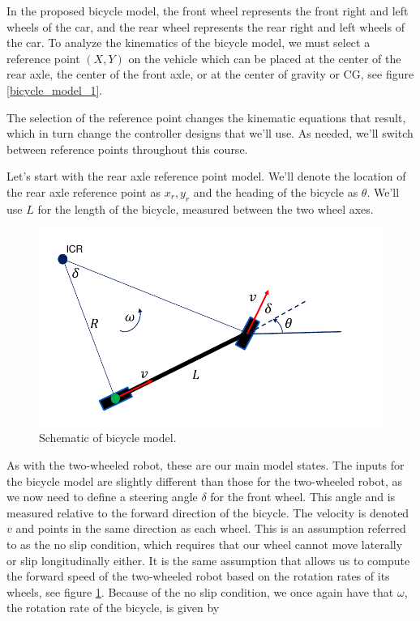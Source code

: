 In the proposed bicycle model, the front wheel represents the front right and left wheels of the car, and the rear wheel represents the rear right and left wheels of the car. 
To analyze the kinematics of the bicycle model, we must select a reference point $(X, Y)$ on the vehicle which can be placed at the center of the rear axle, the center of the front axle, or at the center of gravity or CG, see figure \ref{bicycle_model_1}. 

The selection of the reference point changes the kinematic equations that result, which in turn change the controller designs that we'll use. As needed, we'll switch between reference points throughout this course. 


Let's start with the rear axle reference point model. We'll denote the location of the rear axle reference point as $x_r, y_r$ and the heading of the bicycle as $\theta$. We'll use $L$ for the length of the bicycle, measured between the two wheel axes. 

\begin{figure}[!htb]
\begin{center}
\includegraphics[scale=0.290]{img/bicycle_model/bicycle_model_2.jpeg}
\end{center}
\caption{Schematic of bicycle model.}
\label{bicycle_model_2}
\end{figure}


As with the two-wheeled robot, these are our main model states. The inputs for the bicycle model are slightly different than those for the two-wheeled robot, as we now need to define a steering angle $\delta$ for the front wheel. This angle and is measured relative to the forward direction of the bicycle. The velocity is denoted $v$ and points in the same direction as each wheel. 
This is an assumption referred to as the no slip condition, which requires that our wheel cannot move laterally or slip longitudinally either. 
It is the same assumption that allows us to compute the forward speed of the two-wheeled robot based on the rotation rates of its wheels, see figure \ref{bicycle_model_2}. 
Because of the no slip condition, we once again have that $\omega$, the rotation rate of the bicycle, is given by


